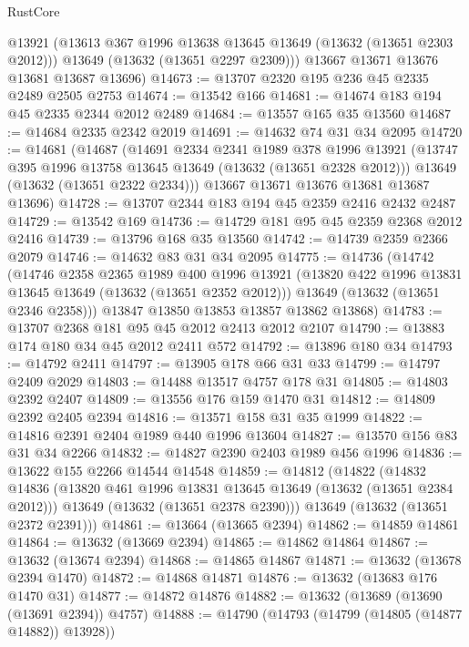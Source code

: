 \begin{lexlean}{RustCore}
\begin{coremodule}
        @13921
        (@13613 @367 @1996 @13638 @13645 @13649 (@13632 (@13651 @2303 @2012)))
        @13649
        (@13632 (@13651 @2297 @2309)))
      @13667
      @13671
      @13676
      @13681
      @13687
      @13696)
@14673 := @13707 @2320 @195 @236 @45 @2335 @2489 @2505 @2753
@14674 := @13542 @166
@14681 := @14674 @183 @194 @45 @2335 @2344 @2012 @2489
@14684 := @13557 @165 @35 @13560
@14687 := @14684 @2335 @2342 @2019
@14691 := @14632 @74 @31 @34 @2095
@14720 := @14681
    (@14687
      (@14691
        @2334
        @2341
        @1989
        @378
        @1996
        @13921
        (@13747 @395 @1996 @13758 @13645 @13649 (@13632 (@13651 @2328 @2012)))
        @13649
        (@13632 (@13651 @2322 @2334)))
      @13667
      @13671
      @13676
      @13681
      @13687
      @13696)
@14728 := @13707 @2344 @183 @194 @45 @2359 @2416 @2432 @2487
@14729 := @13542 @169
@14736 := @14729 @181 @95 @45 @2359 @2368 @2012 @2416
@14739 := @13796 @168 @35 @13560
@14742 := @14739 @2359 @2366 @2079
@14746 := @14632 @83 @31 @34 @2095
@14775 := @14736
    (@14742
      (@14746
        @2358
        @2365
        @1989
        @400
        @1996
        @13921
        (@13820 @422 @1996 @13831 @13645 @13649 (@13632 (@13651 @2352 @2012)))
        @13649
        (@13632 (@13651 @2346 @2358)))
      @13847
      @13850
      @13853
      @13857
      @13862
      @13868)
@14783 := @13707 @2368 @181 @95 @45 @2012 @2413 @2012 @2107
@14790 := @13883 @174 @180 @34 @45 @2012 @2411 @572
@14792 := @13896 @180 @34
@14793 := @14792 @2411
@14797 := @13905 @178 @66 @31 @33
@14799 := @14797 @2409 @2029
@14803 := @14488 @13517 @4757 @178 @31
@14805 := @14803 @2392 @2407
@14809 := @13556 @176 @159 @1470 @31
@14812 := @14809 @2392 @2405 @2394
@14816 := @13571 @158 @31 @35 @1999
@14822 := @14816 @2391 @2404 @1989 @440 @1996 @13604
@14827 := @13570 @156 @83 @31 @34 @2266
@14832 := @14827 @2390 @2403 @1989 @456 @1996
@14836 := @13622 @155 @2266 @14544 @14548
@14859 := @14812
    (@14822
      (@14832
        @14836
        (@13820 @461 @1996 @13831 @13645 @13649 (@13632 (@13651 @2384 @2012)))
        @13649
        (@13632 (@13651 @2378 @2390)))
      @13649
      (@13632 (@13651 @2372 @2391)))
@14861 := @13664 (@13665 @2394)
@14862 := @14859 @14861
@14864 := @13632 (@13669 @2394)
@14865 := @14862 @14864
@14867 := @13632 (@13674 @2394)
@14868 := @14865 @14867
@14871 := @13632 (@13678 @2394 @1470)
@14872 := @14868 @14871
@14876 := @13632 (@13683 @176 @1470 @31)
@14877 := @14872 @14876
@14882 := @13632 (@13689 (@13690 (@13691 @2394)) @4757)
@14888 := @14790 (@14793 (@14799 (@14805 (@14877 @14882)) @13928))

\end{coremodule}
\end{lexlean}
